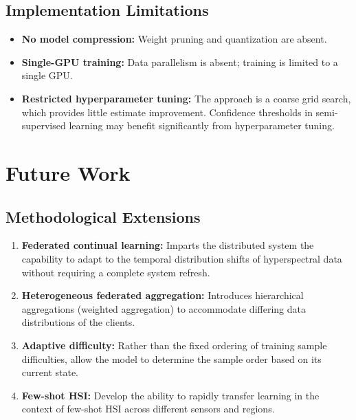 \subsection{Implementation Limitations}
\begin{itemize}
    \item \textbf{No model compression:} Weight pruning and quantization are absent.

    \item \textbf{Single-GPU training:} Data parallelism is absent; training is limited to a single GPU.

    \item \textbf{Restricted hyperparameter tuning:} The approach is a coarse grid search, which provides little estimate improvement. Confidence thresholds in semi-supervised learning may benefit significantly from hyperparameter tuning.
\end{itemize}

\section{Future Work}

\subsection{Methodological Extensions}
\begin{enumerate}
    \item \textbf{Federated continual learning:} Imparts the distributed system the capability to adapt to the temporal distribution shifts of hyperspectral data without requiring a complete system refresh.

    \item \textbf{Heterogeneous federated aggregation:} Introduces hierarchical aggregations (weighted aggregation) to accommodate differing data distributions of the clients.

    \item \textbf{Adaptive difficulty:} Rather than the fixed ordering of training sample difficulties, allow the model to determine the sample order based on its current state.

    \item \textbf{Few-shot HSI:} Develop the ability to rapidly transfer learning in the context of few-shot HSI across different sensors and regions.
\end{enumerate}

